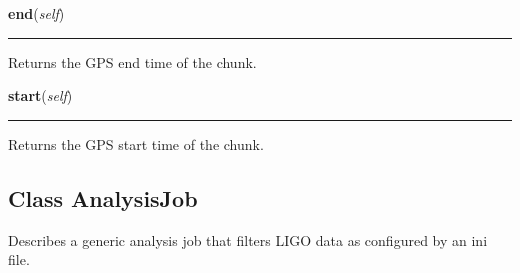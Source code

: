     \label{pipeline:AnalysisChunk:end}
    \vspace{0.5ex}

    \noindent\begin{boxedminipage}{\textwidth}

    \raggedright \textbf{end}(\textit{self})

    \vspace{-1.5ex}

    \rule{\textwidth}{0.5\fboxrule}
    Returns the GPS end time of the chunk.

    \vspace{1ex}

    \end{boxedminipage}

    \label{pipeline:AnalysisChunk:start}
    \vspace{0.5ex}

    \noindent\begin{boxedminipage}{\textwidth}

    \raggedright \textbf{start}(\textit{self})

    \vspace{-1.5ex}

    \rule{\textwidth}{0.5\fboxrule}
    Returns the GPS start time of the chunk.

    \vspace{1ex}

    \end{boxedminipage}



\subsection{Class AnalysisJob}

    \label{pipeline:AnalysisJob}
Describes a generic analysis job that filters LIGO data as configured by 
an ini file.



